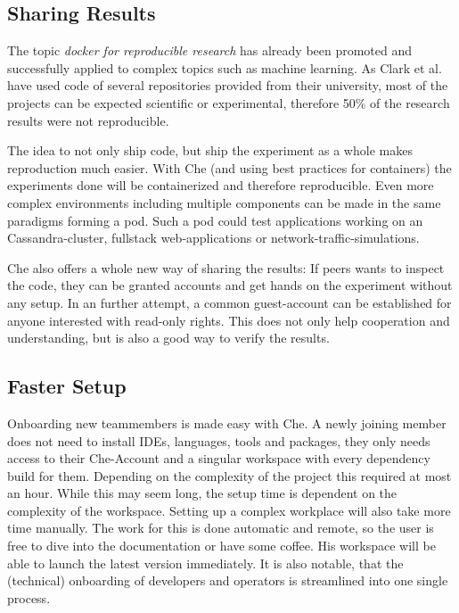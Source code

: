 \documentclass[english,utf8]{lni}
\begin{document}
\subsection{Sharing Results}
The topic \textit{docker for reproducible research} has already been promoted \cite{BO15} and successfully applied to complex topics \cite{ST16} such as machine learning. 
As Clark et al. \cite{CL14} have used code of several repositories provided from their university, most of the projects can be expected scientific or experimental, therefore 50\% of the research results were not reproducible. 

The idea to not only ship code, but ship the experiment as a whole makes reproduction much easier. 
With Che (and using best practices for containers) the experiments done will be containerized and therefore reproducible. 
Even more complex environments including multiple components can be made in the same paradigms forming a pod. 
Such a pod could test applications working on an Cassandra-cluster, fullstack web-applications or network-traffic-simulations.  

Che also offers a whole new way of sharing the results: 
If peers wants to inspect the code, they can be granted accounts and get hands on the experiment without any setup. 
In an further attempt, a common guest-account can be established for anyone interested with read-only rights. 
This does not only help cooperation and understanding, but is also a good way to verify the results.
\subsection{Faster Setup}
Onboarding new teammembers is made easy with Che. 
A newly joining member does not need to install IDEs, languages, tools and packages, they only needs access to their Che-Account and a singular workspace with every dependency build for them.
Depending on the complexity of the project this required at most an hour. 
While this may seem long, the setup time is dependent on the complexity of the workspace. 
Setting up a complex workplace will also take more time manually. 
The work for this is done automatic and remote, so the user is free to dive into the documentation or have some coffee. 
His workspace will be able to launch the latest version immediately.
It is also notable, that the (technical) onboarding of developers and operators is streamlined into one single process. 
\end{document}
